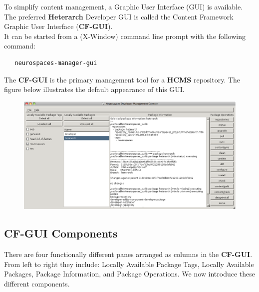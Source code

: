 \documentclass[12pt]{article}
\begin{document}
To simplify content management, a Graphic User Interface (GUI) is available.\\
The preferred {\bf \small Heterarch} Developer GUI is called the Content Framework Graphic User Interface ({\small \bf CF-GUI}).\\
\noindent It can be started from a (X-Window) command line prompt with the following command:

\begin{verbatim}
   neurospaces-manager-gui
\end{verbatim}

\noindent The {\small \bf CF-GUI} is the primary management tool for a {\bf \small HCMS} repository. The figure below illustrates the default appearance of this GUI.

\begin{figure}[h]
   \centering
   \includegraphics[scale=0.4]{figures/neurospaces-developer-management-console.eps}
\end{figure}

\subsection*{CF-GUI Components}

There are four functionally different panes arranged as columns in the {\small \bf CF-GUI}. From left to right they include: Locally Available Package Tags, Locally Available Packages, Package Information, and Package Operations.
We now introduce these different components.
\end{document}

